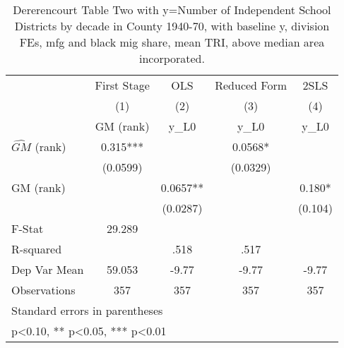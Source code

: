\begin{table}[htbp]\centering
\def\sym#1{\ifmmode^{#1}\else\(^{#1}\)\fi}
\caption{Dererencourt Table Two with y=Number of Independent School Districts by decade in County 1940-70, with baseline y, division FEs, mfg and black mig share, mean TRI, above median area incorporated.}
\begin{tabular}{l*{4}{c}}
\toprule
                    & First Stage   &         OLS   &Reduced Form   &        2SLS   \\
                    &\multicolumn{1}{c}{(1)}&\multicolumn{1}{c}{(2)}&\multicolumn{1}{c}{(3)}&\multicolumn{1}{c}{(4)}\\
                    &\multicolumn{1}{c}{GM  (rank)}&\multicolumn{1}{c}{y\_L0}&\multicolumn{1}{c}{y\_L0}&\multicolumn{1}{c}{y\_L0}\\
\midrule
$\hat{GM}$ (rank)   &       0.315***&               &      0.0568*  &               \\
                    &    (0.0599)   &               &    (0.0329)   &               \\
\addlinespace
GM  (rank)          &               &      0.0657** &               &       0.180*  \\
                    &               &    (0.0287)   &               &     (0.104)   \\
\midrule
F-Stat              &      29.289   &               &               &               \\
R-squared           &               &        .518   &        .517   &               \\
Dep Var Mean        &      59.053   &       -9.77   &       -9.77   &       -9.77   \\
Observations        &         357   &         357   &         357   &         357   \\
\bottomrule
\multicolumn{5}{l}{\footnotesize Standard errors in parentheses}\\
\multicolumn{5}{l}{\footnotesize * p<0.10, ** p<0.05, *** p<0.01}\\
\end{tabular}
\end{table}
